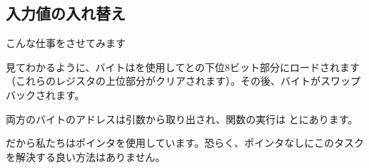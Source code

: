 \subsection{入力値の入れ替え}

こんな仕事をさせてみます



見てわかるように、バイトはを使用してとの下位8ビット部分にロードされます
（これらのレジスタの上位部分がクリアされます）。その後、バイトがスワップバックされます。



両方のバイトのアドレスは引数から取り出され、関数の実行は
とにあります。

だから私たちはポインタを使用しています。恐らく、ポインタなしにこのタスクを解決する良い方法はありません。
